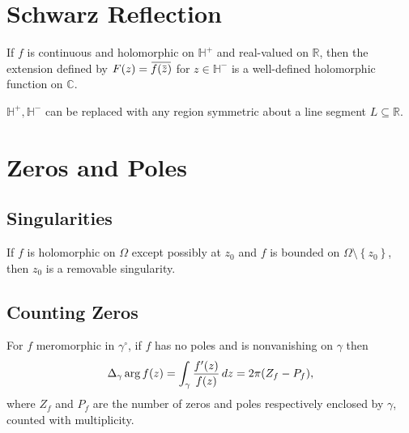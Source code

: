 \hypertarget{schwarz-reflection}{%
\section{Schwarz Reflection}\label{schwarz-reflection}}

\begin{theorem}

If \(f\) is continuous and holomorphic on \({\mathbb{H}}^+\) and
real-valued on \({\mathbb{R}}\), then the extension defined by
\(F(z) = \mkern 1.5mu\overline{\mkern-1.5muf(\mkern 1.5mu\overline{\mkern-1.5muz\mkern-1.5mu}\mkern 1.5mu)\mkern-1.5mu}\mkern 1.5mu\)
for \(z\in {\mathbb{H}}^-\) is a well-defined holomorphic function on
\({\mathbb{C}}\).

\end{theorem}

\begin{remark}

\({\mathbb{H}}^+, {\mathbb{H}}^-\) can be replaced with any region
symmetric about a line segment \(L\subseteq {\mathbb{R}}\).

\end{remark}

\hypertarget{zeros-and-poles}{%
\section{Zeros and Poles}\label{zeros-and-poles}}

\hypertarget{singularities}{%
\subsection{Singularities}\label{singularities}}

\begin{theorem}

If \(f\) is holomorphic on \(\Omega\) except possibly at \(z_0\) and
\(f\) is bounded on \(\Omega\setminus\left\{{z_0}\right\}\), then
\(z_0\) is a removable singularity.

\end{theorem}

\hypertarget{counting-zeros}{%
\subsection{Counting Zeros}\label{counting-zeros}}

\begin{theorem}

For \(f\) meromorphic in \(\gamma^\circ\), if \(f\) has no poles and is
nonvanishing on \(\gamma\) then
\begin{align*}  
\Delta_\gamma \arg f(z) = \int_\gamma {f'(z) \over f(z)} \,dz = 2\pi (Z_f - P_f)
,\end{align*}
where \(Z_f\) and \(P_f\) are the number of zeros and poles respectively
enclosed by \(\gamma\), counted with multiplicity.

\end{theorem}

